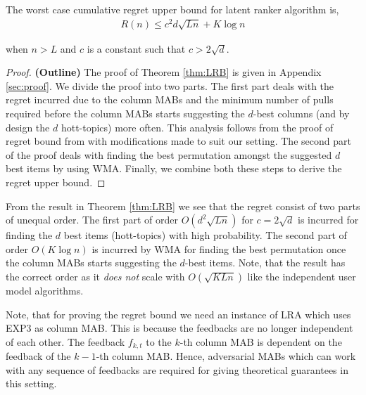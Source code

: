 \begin{theorem}
\label{thm:LRB}
The worst case cumulative regret upper bound for latent ranker algorithm is,
\begin{align*}
R(n) \leq c^2d \sqrt{L n} + K \log n
\end{align*}

when $n > L$ and $c$ is a constant such that $c > 2\sqrt{d}$.
\end{theorem}

\begin{proof} \textbf{(Outline)}
The proof of Theorem \ref{thm:LRB} is given in Appendix \ref{sec:proof}. We divide the proof into two parts. The first part deals with the regret incurred due to the column MABs and the minimum number of pulls required before the column MABs starts suggesting the $d$-best columns (and by design the $d$ hott-topics) more often. This analysis follows from the proof of regret bound from \citet{radlinski2008learning} with modifications made to suit our setting. The second part of the proof deals with finding the best permutation amongst the suggested $d$ best items by using WMA. Finally, we combine both these steps to derive the regret upper bound.
\end{proof}

\begin{discussion}
\label{disc:proof1}
From the result in Theorem \ref{thm:LRB} we see that the regret consist of two parts of unequal order. The first part of order $O\left(d^2 \sqrt{L n} \right)$ for $c = 2\sqrt{d}$ is incurred for finding the $d$ best items (hott-topics) with high probability. The second part of order $O\left( K\log n\right)$ is incurred by WMA for finding the best permutation once the column MABs starts suggesting the $d$-best items. Note, that the result has the correct order as it \textit{does not} scale with $O\left(\sqrt{KLn}\right)$ like the independent user model algorithms.
\end{discussion}

\begin{discussion}
\label{disc:proof2}
Note, that for proving the regret bound we need an instance of LRA which uses EXP3 as column MAB. This is because the feedbacks are no longer independent of each other. The feedback $f_{k,t}$ to the $k$-th column MAB  is dependent on the feedback of the $k-1$-th column MAB. Hence, adversarial MABs which can work with any sequence of feedbacks are required for giving theoretical guarantees in this setting.
\end{discussion}

